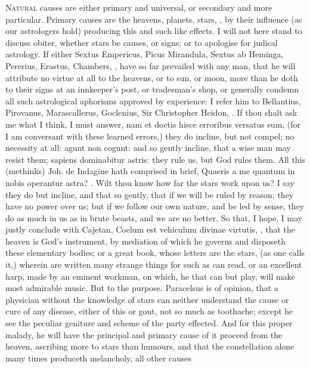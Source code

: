 {\lettrine{N}{atural} causes are either primary and universal, or secondary and more
particular. Primary causes are the heavens, planets, stars, \etc{}, by
their influence (as our astrologers hold) producing this and such like
effects. I will not here stand to discuss obiter, whether stars be
causes, or signs; or to apologise for judical astrology. If either
Sextus Empericus, Picus Mirandula, Sextus ab Heminga, Pererius,
Erastus, Chambers, \etc{}, have so far prevailed with any man, that he
will attribute no virtue at all to the heavens, or to sun, or moon,
more than he doth to their signs at an innkeeper's post, or tradesman's
shop, or generally condemn all such astrological aphorisms approved by
experience: I refer him to Bellantius, Pirovanus, Marascallerus,
Goclenius, Sir Christopher Heidon, \etc{}. If thou shalt ask me what I
think, I must answer, nam et doctis hisce erroribus versatus sum, (for
I am conversant with these learned errors,) they do incline, but not
compel; no necessity at all: agunt non cogunt: and so gently
incline, that a wise man may resist them; sapiens dominabitur astris:
they rule us, but God rules them. All this (methinks) Joh. de
Indagine hath comprised in brief, Quaeris a me quantum in nobis
operantur astra? \etc{}. Wilt thou know how far the stars work upon us? I
say they do but incline, and that so gently, that if we will be ruled
by reason, they have no power over us; but if we follow our own nature,
and be led by sense, they do as much in us as in brute beasts, and we
are no better. So that, I hope, I may justly conclude with
Cajetan, Coelum est vehiculum divinae virtutis, \etc{}, that the
heaven is God's instrument, by mediation of which he governs and
disposeth these elementary bodies; or a great book, whose letters are
the stars, (as one calls it,) wherein are written many strange things
for such as can read, or an excellent harp, made by an eminent
workman, on which, he that can but play, will make most admirable
music. But to the purpose.
Paracelsus is of opinion, that a physician without the knowledge
of stars can neither understand the cause or cure of any disease,
either of this or gout, not so much as toothache; except he see the
peculiar geniture and scheme of the party effected. And for this proper
malady, he will have the principal and primary cause of it proceed from
the heaven, ascribing more to stars than humours, and that the
constellation alone many times produceth melancholy, all other causes
}
